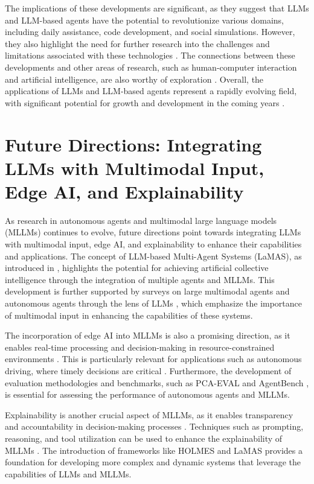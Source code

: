 \documentclass[conference]{IEEEtran}
\begin{document}
The implications of these developments are significant, as they suggest that LLMs and LLM-based agents have the potential to revolutionize various domains, including daily assistance, code development, and social simulations. However, they also highlight the need for further research into the challenges and limitations associated with these technologies \cite{2408.02479, 2411.14033}. The connections between these developments and other areas of research, such as human-computer interaction and artificial intelligence, are also worthy of exploration \cite{2310.14985, 2402.01680}. Overall, the applications of LLMs and LLM-based agents represent a rapidly evolving field, with significant potential for growth and development in the coming years \cite{2408.02479, 2411.14033}.

\section{Future Directions: Integrating LLMs with Multimodal Input, Edge AI, and Explainability}
As research in autonomous agents and multimodal large language models (MLLMs) continues to evolve, future directions point towards integrating LLMs with multimodal input, edge AI, and explainability to enhance their capabilities and applications. The concept of LLM-based Multi-Agent Systems (LaMAS), as introduced in \cite{2411.14033}, highlights the potential for achieving artificial collective intelligence through the integration of multiple agents and MLLMs. This development is further supported by surveys on large multimodal agents \cite{2402.15116} and autonomous agents through the lens of LLMs \cite{2404.04442}, which emphasize the importance of multimodal input in enhancing the capabilities of these systems.

The incorporation of edge AI into MLLMs is also a promising direction, as it enables real-time processing and decision-making in resource-constrained environments \cite{2310.02071}. This is particularly relevant for applications such as autonomous driving, where timely decisions are critical \cite{2311.12320}. Furthermore, the development of evaluation methodologies and benchmarks, such as PCA-EVAL \cite{2407.00118} and AgentBench \cite{2308.03688}, is essential for assessing the performance of autonomous agents and MLLMs.

Explainability is another crucial aspect of MLLMs, as it enables transparency and accountability in decision-making processes \cite{2402.11941}. Techniques such as prompting, reasoning, and tool utilization can be used to enhance the explainability of MLLMs \cite{2404.04442}. The introduction of frameworks like HOLMES \cite{2310.02071} and LaMAS \cite{2411.14033} provides a foundation for developing more complex and dynamic systems that leverage the capabilities of LLMs and MLLMs.
\end{document}
